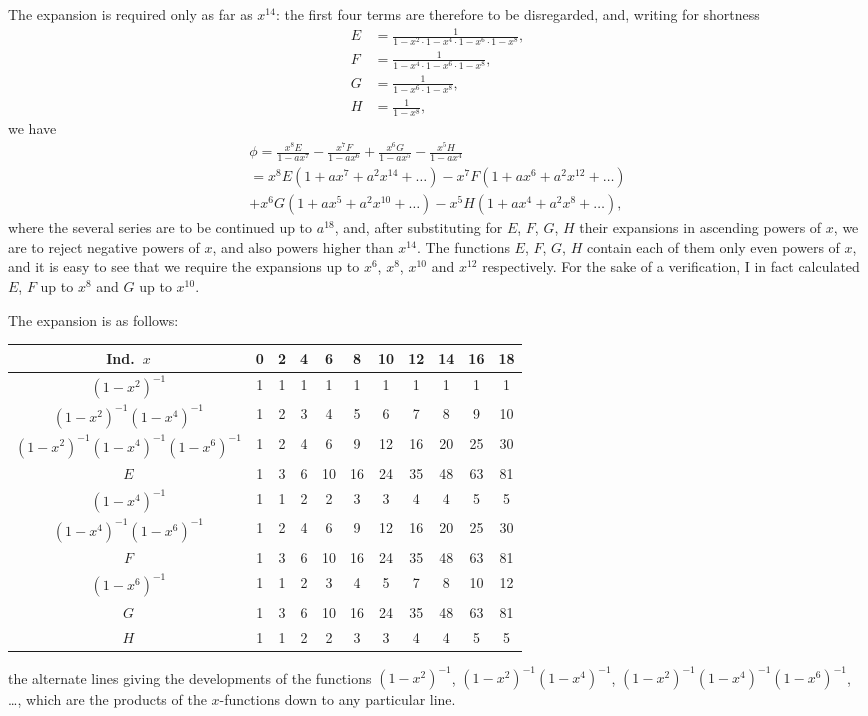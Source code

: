 \documentclass[11pt,a4paper]{book}
\begin{document}
\clearpage
The expansion is required only as far as $x^{14}$: the first four terms are therefore to be disregarded, and, writing for shortness
\begin{align*}
E &= \frac{1}{1 - x^2 \cdot 1 - x^4 \cdot 1 - x^6 \cdot 1 - x^8}, \\
F &= \frac{1}{1 - x^4 \cdot 1 - x^6 \cdot 1 - x^8}, \\
G &= \frac{1}{1 - x^6 \cdot 1 - x^8}, \\
H &= \frac{1}{1 - x^8},
\end{align*}
we have
\begin{multline*}
\phi = \frac{x^8E}{1 - ax^7} - \frac{x^7F}{1 - ax^6} + \frac{x^6G}{1 - ax^5} - \frac{x^5H}{1 - ax^4} \\
= x^8E(1 + ax^7 + a^2x^{14} + \dots) - x^7F(1 + ax^6 + a^2x^{12} + \dots) \\
+ x^6G(1 + ax^5 + a^2x^{10} + \dots) - x^5H(1 + ax^4 + a^2x^8 + \dots),
\end{multline*}
where the several series are to be continued up to $a^{18}$, and, after substituting for $E$, $F$, $G$, $H$ their expansions in ascending powers of $x$, we are to reject negative powers of $x$, and also powers higher than $x^{14}$. The functions $E$, $F$, $G$, $H$ contain each of them only even powers of $x$, and it is easy to see that we require the expansions up to $x^6$, $x^8$, $x^{10}$ and $x^{12}$ respectively. For the sake of a verification, I in fact calculated $E$, $F$ up to $x^8$ and $G$ up to $x^{10}$.

\clearpage
The expansion is as follows:

\begin{center}
\begin{tabular}{c|cccccccccc}
Ind.\ $x$ & 0 & 2 & 4 & 6 & 8 & 10 & 12 & 14 & 16 & 18 \\
\hline
$(1 - x^2)^{-1}$ & 1 & 1 & 1 & 1 & 1 & 1 & 1 & 1 & 1 & 1 \\
$(1 - x^2)^{-1}(1 - x^4)^{-1}$ & 1 & 2 & 3 & 4 & 5 & 6 & 7 & 8 & 9 & 10 \\
$(1 - x^2)^{-1}(1 - x^4)^{-1}(1 - x^6)^{-1}$ & 1 & 2 & 4 & 6 & 9 & 12 & 16 & 20 & 25 & 30 \\
$E$ & 1 & 3 & 6 & 10 & 16 & 24 & 35 & 48 & 63 & 81 \\
$(1 - x^4)^{-1}$ & 1 & 1 & 2 & 2 & 3 & 3 & 4 & 4 & 5 & 5 \\
$(1 - x^4)^{-1}(1 - x^6)^{-1}$ & 1 & 2 & 4 & 6 & 9 & 12 & 16 & 20 & 25 & 30 \\
$F$ & 1 & 3 & 6 & 10 & 16 & 24 & 35 & 48 & 63 & 81 \\
$(1 - x^6)^{-1}$ & 1 & 1 & 2 & 3 & 4 & 5 & 7 & 8 & 10 & 12 \\
$G$ & 1 & 3 & 6 & 10 & 16 & 24 & 35 & 48 & 63 & 81 \\
$H$ & 1 & 1 & 2 & 2 & 3 & 3 & 4 & 4 & 5 & 5
\end{tabular}
\end{center}
the alternate lines giving the developments of the functions $(1 - x^2)^{-1}$, $(1 - x^2)^{-1}(1 - x^4)^{-1}$, $(1 - x^2)^{-1}(1 - x^4)^{-1}(1 - x^6)^{-1}$, \dots, which are the products of the $x$-functions down to any particular line.
\end{document}

